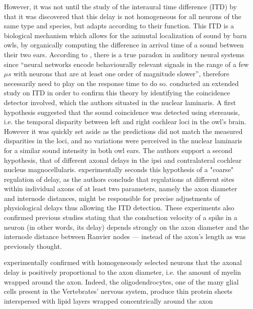 \documentclass[brainsci, %
               review,submit,pdftex,moreauthors
               ]{Definitions/mdpi}
\begin{document}
However, it was not until the study of the interaural time difference (ITD) by~\citet{gerstner_neuronal_1996} that it was discovered that this delay is not homogeneous for all neurons of the same type and species, but adapts according to their function. This ITD is a biological mechanism which allows for the azimutal localization of sound by barn owls, by organically computing the difference in arrival time of a sound between their two ears. According to \citep{gerstner_neuronal_1996}, there is a true paradox in auditory neural systems since “neural networks encode behaviourally relevant signals in the range of a few $\mu s$ with neurons that are at least one order of magnitude slower”, therefore necessarily need to play on the response time to do so. \citet{pena_2001} conducted an extended study on ITD in order to confirm this theory by identifying the coincidence detector involved, which the authors situated in the nuclear laminaris. A first hypothesis suggested that the sound coincidence was detected using stereausis, i.e. the temporal disparity between left and right cochlear loci in the owl's brain. However it was quickly set aside as the predictions did not match the measured disparities in the loci, and no variations were perceived in the nuclear laminaris for a similar sound intensity in both owl ears. The authors support a second hypothesis, that of different axonal delays in the ipsi and contralateral cochlear nucleus magnocellularis. \citet{seidl_mechanisms_2010} experimentally seconds this hypothesis of a "coarse" regulation of delay, as the authors conclude that regulations at different sites within individual axons of at least two parameters, namely the axon diameter and internode distances, might be responsible for precise adjustments of physiological delays thus allowing the ITD detection. These experiments also confirmed previous studies stating that the conduction velocity of a spike in a neuron (in other words, its delay) depends strongly on the axon diameter \cite{gasser_1939} and the internode distance between Ranvier nodes \cite{brills_1977} --- instead of the axon's length as was previously thought. 


\citet{gasser_1939} experimentally confirmed with homogeneously selected neurons that the axonal delay is positively proportional to the axon diameter, i.e. the amount of myelin wrapped around the axon. Indeed, the oligodendrocytes, one of the many glial cells present in the Vertebrates' nervous system, produce thin protein sheets interspersed with lipid layers wrapped concentrically around the axon~\citep{schmidt_1939}
\end{document}
